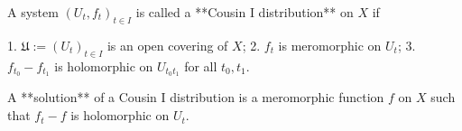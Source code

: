 A system $(U_t, f_t)_{t \in I}$ is called a **Cousin I distribution** on $X$ if

1. $\mathfrak{U} := (U_t)_{t \in I}$ is an open covering of $X$;
2. $f_t$ is meromorphic on $U_t$;
3. $f_{t_0} - f_{t_1}$ is holomorphic on $U_{t_0t_1}$ for all $t_0, t_1$.

A **solution** of a Cousin I distribution is a meromorphic function $f$ on $X$ such that $f_t - f$ is holomorphic on $U_t$.
